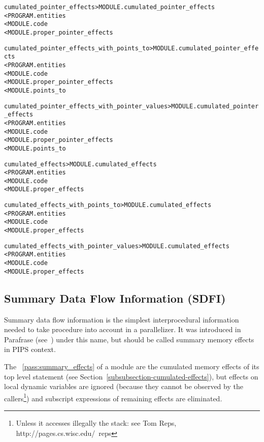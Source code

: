 \documentclass[a4paper]{report}
\newenvironment{PipsMake}{\begin{alltt}}{\end{alltt}}
\newcommand{\PipsPassRef}[1]{\texttt{\detokenize{#1}}~\ref{pass:#1}}
\newenvironment{PipsPass}[1]{\label{pass:#1}}{}
\begin{document}
\begin{PipsMake}
cumulated_pointer_effects   > MODULE.cumulated_pointer_effects
        < PROGRAM.entities
        < MODULE.code
        < MODULE.proper_pointer_effects
\end{PipsMake}

\begin{PipsMake}
cumulated_pointer_effects_with_points_to > MODULE.cumulated_pointer_effects
        < PROGRAM.entities
        < MODULE.code
        < MODULE.proper_pointer_effects
        < MODULE.points_to
\end{PipsMake}

\begin{PipsMake}
cumulated_pointer_effects_with_pointer_values > MODULE.cumulated_pointer_effects
        < PROGRAM.entities
        < MODULE.code
        < MODULE.proper_pointer_effects
        < MODULE.points_to
\end{PipsMake}

\begin{PipsMake}
cumulated_effects            > MODULE.cumulated_effects
        < PROGRAM.entities
        < MODULE.code
        < MODULE.proper_effects
\end{PipsMake}

\begin{PipsMake}
cumulated_effects_with_points_to        > MODULE.cumulated_effects
        < PROGRAM.entities
        < MODULE.code
        < MODULE.proper_effects
\end{PipsMake}

\begin{PipsMake}
cumulated_effects_with_pointer_values   > MODULE.cumulated_effects
        < PROGRAM.entities
        < MODULE.code
        < MODULE.proper_effects
\end{PipsMake}

\subsection{Summary Data Flow Information (SDFI)}
\label{subsubection-summary-data-flow-information}

Summary data flow information is the simplest interprocedural
information needed to take procedure into account in a
parallelizer. It was introduced in Parafrase (see~\cite{LY88c}) under
this name, but should be called summary memory effects in PIPS context.

\begin{PipsPass}{summary_effects}
The \PipsPassRef{summary_effects} of a module are the cumulated memory
effects of its
top level statement (see Section~\ref{subsubsection-cumulated-effects}), but effects on local dynamic variables are
ignored (because they cannot be observed by the callers\footnote{Unless
it accesses illegally the stack: see Tom Reps,
http://pages.cs.wisc.edu/~reps}) and subscript expressions of remaining
effects are eliminated.
\end{PipsPass}
\end{document}
